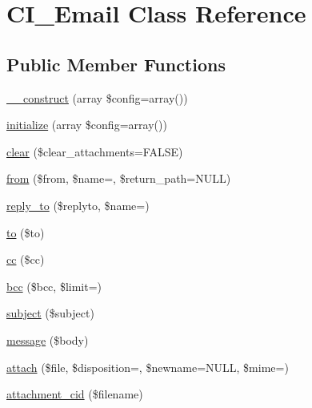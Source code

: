 \hypertarget{class_c_i___email}{}\section{C\+I\+\_\+\+Email Class Reference}
\label{class_c_i___email}
\subsection*{Public Member Functions}
\begin{DoxyCompactItemize}
\item 
\mbox{\hyperlink{class_c_i___email_a27541ea39dbd180e9ad69e605a2028b0}{\+\_\+\+\_\+construct}} (array \$config=array())
\item 
\mbox{\hyperlink{class_c_i___email_acf78fb43c0196f1b0aadedb840b53c1f}{initialize}} (array \$config=array())
\item 
\mbox{\hyperlink{class_c_i___email_a7c0f66ed81021608123984c93cec8df5}{clear}} (\$clear\+\_\+attachments=F\+A\+L\+SE)
\item 
\mbox{\hyperlink{class_c_i___email_afc15c3b85c43bd8623ba643019bf7d4b}{from}} (\$from, \$name=\textquotesingle{}\textquotesingle{}, \$return\+\_\+path=N\+U\+LL)
\item 
\mbox{\hyperlink{class_c_i___email_af6dd3c40001406a383f56ac489d4924b}{reply\+\_\+to}} (\$replyto, \$name=\textquotesingle{}\textquotesingle{})
\item 
\mbox{\hyperlink{class_c_i___email_abcd42d409d0072eeb2b9b44860f759c0}{to}} (\$to)
\item 
\mbox{\hyperlink{class_c_i___email_aaf1691518b38796d59f44434707a36a6}{cc}} (\$cc)
\item 
\mbox{\hyperlink{class_c_i___email_a85f20aa59849b09a0d1b72df04552503}{bcc}} (\$bcc, \$limit=\textquotesingle{}\textquotesingle{})
\item 
\mbox{\hyperlink{class_c_i___email_a14795b95ebaa3941a2c5a11ee7ddbeae}{subject}} (\$subject)
\item 
\mbox{\hyperlink{class_c_i___email_a736023efc585e0dafa3a5d3da8fcfbc1}{message}} (\$body)
\item 
\mbox{\hyperlink{class_c_i___email_a61f319b2e81ea8764642263f7427ffbf}{attach}} (\$file, \$disposition=\textquotesingle{}\textquotesingle{}, \$newname=N\+U\+LL, \$mime=\textquotesingle{}\textquotesingle{})
\item 
\mbox{\hyperlink{class_c_i___email_a8e8248538df17726baffbd6b7c07da1d}{attachment\+\_\+cid}} (\$filename)
\item 

\end{DoxyCompactItemize}
